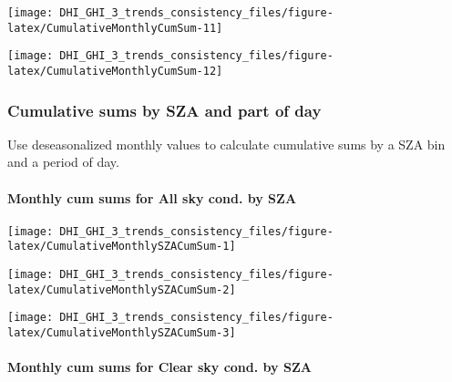 \documentclass[
  10pt,
  a4paper,oneside]{article}
\begin{document}
\normalsize

\begin{center}\texttt{[image: DHI\_GHI\_3\_trends\_consistency\_files/figure-latex/CumulativeMonthlyCumSum-11]} \end{center}

\begin{center}\texttt{[image: DHI\_GHI\_3\_trends\_consistency\_files/figure-latex/CumulativeMonthlyCumSum-12]} \end{center}

\newpage
\FloatBarrier

\hypertarget{cumulative-sums-by-sza-and-part-of-day}{%
\subsubsection{Cumulative sums by SZA and part of day}\label{cumulative-sums-by-sza-and-part-of-day}}

Use deseasonalized monthly values to calculate cumulative sums
by a SZA bin and a period of day.

\newpage

\FloatBarrier

\hypertarget{monthly-cum-sums-for-all-sky-cond.-by-sza}{%
\paragraph{Monthly cum sums for All sky cond. by SZA}\label{monthly-cum-sums-for-all-sky-cond.-by-sza}}

\begin{center}\texttt{[image: DHI\_GHI\_3\_trends\_consistency\_files/figure-latex/CumulativeMonthlySZACumSum-1]} \end{center}

\begin{center}\texttt{[image: DHI\_GHI\_3\_trends\_consistency\_files/figure-latex/CumulativeMonthlySZACumSum-2]} \end{center}

\begin{center}\texttt{[image: DHI\_GHI\_3\_trends\_consistency\_files/figure-latex/CumulativeMonthlySZACumSum-3]} \end{center}

\newpage

\FloatBarrier

\hypertarget{monthly-cum-sums-for-clear-sky-cond.-by-sza}{%
\paragraph{Monthly cum sums for Clear sky cond. by SZA}\label{monthly-cum-sums-for-clear-sky-cond.-by-sza}}
\end{document}
